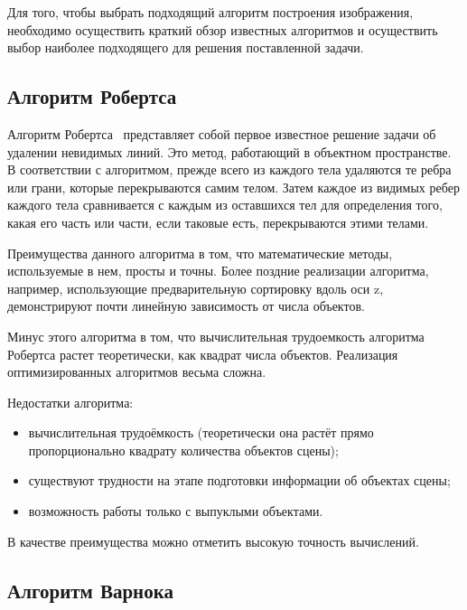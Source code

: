 Для того, чтобы выбрать подходящий алгоритм построения изображения, необходимо осуществить краткий обзор известных алгоритмов и осуществить выбор наиболее подходящего для решения поставленной задачи.

\subsection{Алгоритм Робертса}

Алгоритм Робертса~\cite{math_cg} представляет собой первое известное решение задачи об удалении невидимых линий. Это метод, работающий в объектном пространстве. В соответствии с алгоритмом, прежде всего из каждого тела удаляются те ребра или грани, которые перекрываются самим телом. Затем каждое из видимых ребер каждого тела сравнивается с каждым из оставшихся тел для определения того, какая его часть или части, если таковые есть, перекрываются этими телами.

Преимущества данного алгоритма в том, что математические методы, используемые в нем, просты и точны. Более поздние реализации алгоритма, например, использующие предварительную сортировку вдоль оси z, демонстрируют почти линейную зависимость от числа объектов.

Минус этого алгоритма в том, что вычислительная трудоемкость алгоритма Робертса растет теоретически, как квадрат числа объектов. Реализация оптимизированных алгоритмов весьма сложна.

Недостатки алгоритма:
\begin{itemize}[label=---]
    \item вычислительная трудоёмкость (теоретически она растёт прямо пропорционально квадрату количества объектов сцены);
    \item существуют трудности на этапе подготовки информации об объектах сцены;
    \item возможность работы только с выпуклыми объектами.
\end{itemize}

В качестве преимущества можно отметить высокую точность вычислений.

\subsection{Алгоритм Варнока}

